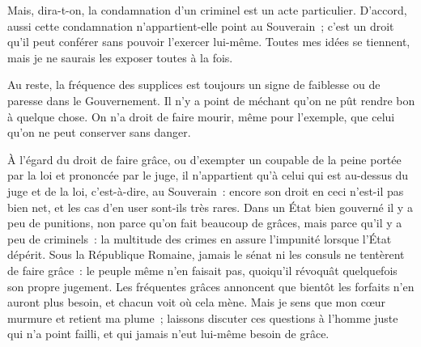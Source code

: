 \documentclass[french,twoside]{book} %
\begin{document}
Mais, dira-t-on, la condamnation d’un criminel est un acte particulier. D’accord, aussi cette condamnation n’appartient-elle point au Souverain ; c’est un droit qu’il peut conférer sans pouvoir l’exercer lui-même. Toutes mes idées se tiennent, mais je ne saurais les exposer toutes à la fois.\par
Au reste, la fréquence des supplices est toujours un signe de faiblesse ou de paresse dans le Gouvernement. Il n’y a point de méchant qu’on ne pût rendre bon à quelque chose. On n’a droit de faire mourir, même pour l’exemple, que celui qu’on ne peut conserver sans danger.\par
À l’égard du droit de faire grâce, ou d’exempter un coupable de la peine portée par la loi et prononcée par le juge, il n’appartient qu’à celui qui est au-dessus du juge et de la loi, c’est-à-dire, au Souverain : encore son droit en ceci n’est-il pas bien net, et les cas d’en user sont-ils très rares. Dans un État bien gouverné il y a peu de punitions, non parce qu’on fait beaucoup de grâces, mais parce qu’il y a peu de criminels : la multitude des crimes en assure l’impunité lorsque l’État dépérit. Sous la République Romaine, jamais le sénat ni les consuls ne tentèrent de faire grâce : le peuple même n’en faisait pas, quoiqu’il révoquât quelquefois son propre jugement. Les fréquentes grâces annoncent que bientôt les forfaits n’en auront plus besoin, et chacun voit où cela mène. Mais je sens que mon cœur murmure et retient ma plume ; laissons discuter ces questions à l’homme juste qui n’a point failli, et qui jamais n’eut lui-même besoin de grâce.
\end{document}
